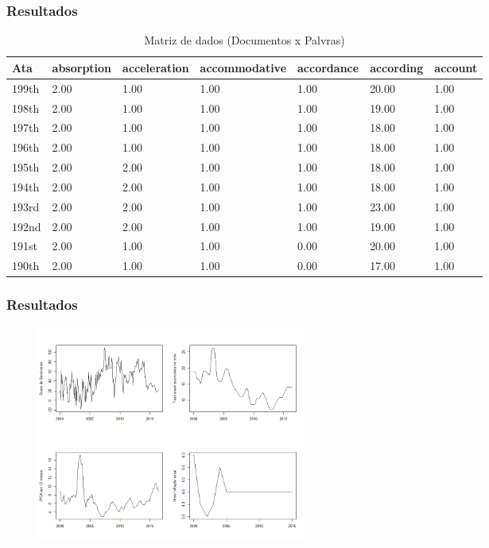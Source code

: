 \documentclass[aspectratio=169]{beamer}
\begin{document}
\begin{frame}\frametitle{Resultados}
  \begin{table}[h!]
  \centering
  \caption{Matriz de dados (Documentos x Palvras)}
  \begin{tabular}{@{}lllllll@{}}
  \toprule
  Ata & absorption & acceleration & accommodative & accordance & according & account \\ 
  \midrule
  199th & 2.00 & 1.00 & 1.00 & 1.00 & 20.00 & 1.00 \\ 
  198th & 2.00 & 1.00 & 1.00 & 1.00 & 19.00 & 1.00 \\ 
  197th & 2.00 & 1.00 & 1.00 & 1.00 & 18.00 & 1.00 \\ 
  196th & 2.00 & 1.00 & 1.00 & 1.00 & 18.00 & 1.00 \\ 
  195th & 2.00 & 2.00 & 1.00 & 1.00 & 18.00 & 1.00 \\ 
  194th & 2.00 & 2.00 & 1.00 & 1.00 & 18.00 & 1.00 \\ 
  193rd & 2.00 & 2.00 & 1.00 & 1.00 & 23.00 & 1.00 \\ 
  192nd & 2.00 & 2.00 & 1.00 & 1.00 & 19.00 & 1.00 \\ 
  191st & 2.00 & 1.00 & 1.00 & 0.00 & 20.00 & 1.00 \\ 
  190th & 2.00 & 1.00 & 1.00 & 0.00 & 17.00 & 1.00 \\ 
  \bottomrule
  \end{tabular}
  \end{table}
\end{frame}

\begin{frame}\frametitle{Resultados}
  \begin{figure}[hb]
  \includegraphics[width=3.5in]{comparative.png}
  \end{figure}
\end{frame}
\end{document}

